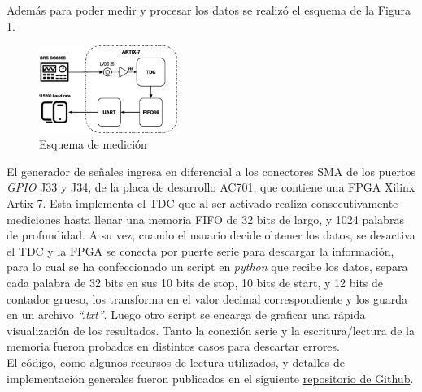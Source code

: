 Además para poder medir y procesar los datos se realizó el esquema de la Figura \ref{fig: esquema}.
\begin{figure}[H]
      \centering
      \includegraphics[width=0.4\textwidth]{imagenes/TDC-functional-blocks.eps}
      \caption{Esquema de medición}
      \label{fig: esquema}
\end{figure}
El generador de señales ingresa en diferencial a los conectores SMA de los puertos \textit{GPIO} J33 y J34, de la
placa de desarrollo AC701, que contiene una FPGA Xilinx Artix-7. Esta implementa el TDC que al ser activado
realiza consecutivamente mediciones hasta llenar una memoria FIFO de 32 bits de largo, y 1024 palabras de profundidad.
A su vez, cuando el usuario decide obtener los datos, se desactiva el TDC y la FPGA se conecta por puerte serie 
para descargar la información, para lo cual se ha confeccionado un script en \textit{python} que recibe los datos,
separa cada palabra de 32 bits en sus 10 bits de stop, 10 bits de start, y 12 bits de contador grueso, los
transforma en el valor decimal correspondiente y los guarda en un archivo \textit{``.txt''}. Luego otro script se encarga
de graficar una rápida visualización de los resultados. Tanto la conexión serie y la escritura/lectura de la memoria fueron
probados en distintos casos para descartar errores.\\

El código, como algunos recursos de lectura utilizados, y detalles de implementación generales fueron publicados en el
siguiente \href{https://github.com/Miquefil/TDC-in-Artix-7}{repositorio de Github}.


\clearpage
